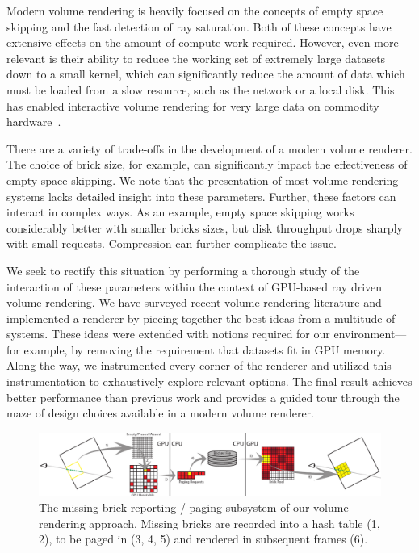Modern volume rendering is heavily focused on the concepts of empty
space skipping and the fast detection of ray saturation.  Both of
these concepts have extensive effects on the amount of compute work
required.  However, even more relevant is their ability to reduce the
working set of extremely large datasets down to a small kernel, which
can significantly reduce the amount of data which must be loaded from a
slow resource, such as the network or a local disk.  This has enabled
interactive volume rendering for very large data on commodity
hardware~\cite{Knoll:2010:BVH, Hadwiger:2012:Guided,
Crassin:2009:Gigavoxels}.

There are a variety of trade-offs in the development of a modern volume
renderer.  The choice of brick size, for example, can significantly
impact the effectiveness of empty space skipping.  We note that the
presentation of most volume rendering systems lacks detailed insight
into these parameters.  Further, these factors can interact in complex
ways.  As an example, empty space skipping works considerably better
with smaller bricks sizes, but disk throughput drops sharply with small
requests.  Compression can further complicate the issue.

We seek to rectify this situation by performing a thorough study of
the interaction of these parameters within the context of GPU-based
ray driven volume rendering.  We have surveyed recent volume rendering
literature and implemented a renderer by piecing together the best
ideas from a multitude of systems. These ideas were extended with
notions required for our environment---for example, by removing
the requirement that datasets fit in GPU memory.  Along the way,
we instrumented every corner of the renderer and utilized this
instrumentation to exhaustively explore relevant options.  The final
result achieves better performance than previous work and provides a
guided tour through the maze of design choices available in a modern
volume renderer.

\begin{figure}
  \centering
  \includegraphics[width=1.00\linewidth]{images/rg/pipeline.pdf}
  \caption{The missing brick reporting / paging subsystem of our volume
  rendering approach.  Missing bricks are recorded into a hash table
  (1, 2), to be paged in (3, 4, 5) and rendered in subsequent frames
  (6).}
  \label{fig:flow}
\end{figure}

